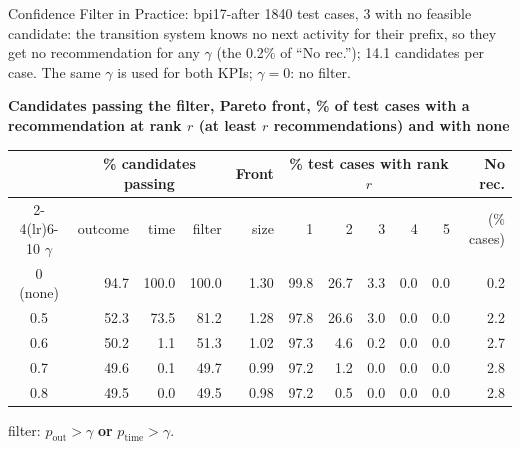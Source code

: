 \documentclass[aspectratio=169]{beamer} %
\begin{document}
\begin{frame}{Confidence Filter in Practice: bpi17-after}
  \small
  1840 test cases, \alert{3 with no feasible candidate}: the transition system knows no next
  activity for their prefix, so they get no recommendation for any $\gamma$ (the 0.2\% of ``No rec.'');
  14.1 candidates per case. The same $\gamma$ is used for both KPIs; $\gamma = 0$: no filter.

  \textbf{Candidates passing the filter, Pareto front, \% of test cases with a recommendation at rank $r$ (at least $r$ recommendations) and with none}
  \begin{center}\setlength{\tabcolsep}{4pt}\setlength{\aboverulesep}{0pt}\setlength{\belowrulesep}{1pt}
  \begin{tabular}{crrrrrrrrrr}
    \toprule
     & \multicolumn{3}{c}{\% candidates passing} & Front & \multicolumn{5}{c}{\% test cases with rank $r$} & No rec. \\
    \cmidrule(lr){2-4}\cmidrule(lr){6-10}
    $\gamma$ & outcome & time & filter & size & 1 & 2 & 3 & 4 & 5 & (\% cases) \\
    \midrule
    0 (none) & 94.7  & 100.0 & 100.0 & 1.30 & 99.8 & 26.7 & 3.3 & 0.0 & 0.0 & 0.2 \\
    0.5      & 52.3  & 73.5  & 81.2  & 1.28 & 97.8 & 26.6 & 3.0 & 0.0 & 0.0 & 2.2 \\
    0.6      & 50.2  & 1.1   & 51.3  & 1.02 & 97.3 & 4.6  & 0.2 & 0.0 & 0.0 & 2.7 \\
    0.7      & 49.6  & 0.1   & 49.7  & 0.99 & 97.2 & 1.2  & 0.0 & 0.0 & 0.0 & 2.8 \\
    0.8      & 49.5  & 0.0   & 49.5  & 0.98 & 97.2 & 0.5  & 0.0 & 0.0 & 0.0 & 2.8 \\
    \bottomrule
  \end{tabular}
  \end{center}
  {\scriptsize filter: $p_{\text{out}} > \gamma$ \textbf{or} $p_{\text{time}} > \gamma$.}
\end{frame}
\end{document}
